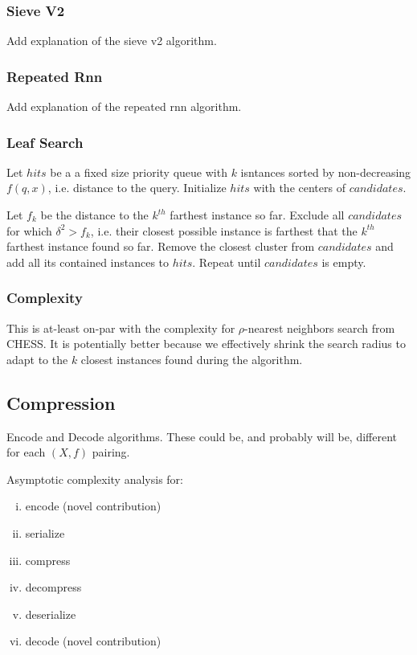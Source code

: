 \subsubsection{Sieve V2}
\label{subsubsec:methods:knn-search:sieve-v2}
Add explanation of the sieve v2 algorithm.

\subsubsection{Repeated Rnn}
\label{subsubsec:methods:knn-search:repeated-rnn}
Add explanation of the repeated rnn algorithm.

\subsubsection{Leaf Search}
\label{subsubsec:methods:knn-search:leaf-search}

Let $hits$ be a a fixed size priority queue with $k$ isntances sorted by non-decreasing $f(q, x)$, i.e. distance to the query.
Initialize $hits$ with the centers of $candidates$.

Let $f_k$ be the distance to the $k^{th}$ farthest instance so far.
Exclude all $candidates$ for which $\delta^2 > f_k$, i.e. their closest possible instance is farthest that the $k^{th}$ farthest instance found so far.
Remove the closest cluster from $candidates$ and add all its contained instances to $hits$.
Repeat until $candidates$ is empty.

\subsubsection{Complexity}
\label{subsubsec:methods:knn-search:complexity}

This is at-least on-par with the complexity for $\rho$-nearest neighbors search from CHESS.
It is potentially better because we effectively shrink the search radius to adapt to the $k$ closest instances found during the algorithm.

\subsection{Compression}
\label{subsec:methods:compression}

Encode and Decode algorithms.
These could be, and probably will be, different for each $(X, f)$ pairing.

Asymptotic complexity analysis for:
\begin{enumerate}[i.]
    \item encode (novel contribution)
    \item serialize
    \item compress
    \item decompress
    \item deserialize
    \item decode (novel contribution)
\end{enumerate}

